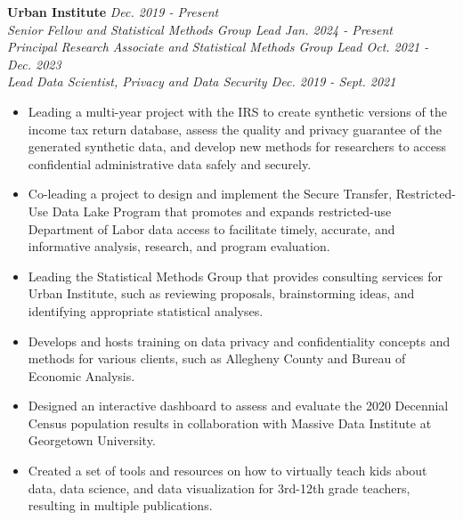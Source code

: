 \documentclass[11pt, letterpaper, roman]{moderncv} %
\begin{document}
\textbf{Urban Institute} \hfill \textit{Dec. 2019 - Present}\\
    \textit{Senior Fellow and Statistical Methods Group Lead \hfill Jan. 2024 - Present}\\
    \textit{Principal Research Associate and Statistical Methods Group Lead \hfill Oct. 2021 - Dec. 2023}\\
    \textit{Lead Data Scientist, Privacy and Data Security \hfill Dec. 2019 - Sept. 2021}
    \begin{itemize}
        \item Leading a multi-year project with the IRS to create synthetic versions of the income tax return database, assess the quality and privacy guarantee of the generated synthetic data, and develop new methods for researchers to access confidential administrative data safely and securely.
        \item Co-leading a project to design and implement the Secure Transfer, Restricted-Use Data Lake Program that promotes and expands restricted-use Department of Labor data access to facilitate timely, accurate, and informative analysis, research, and program evaluation.
        \item Leading the Statistical Methods Group that provides consulting services for Urban Institute, such as reviewing proposals, brainstorming ideas, and identifying appropriate statistical analyses.
        \item Develops and hosts training on data privacy and confidentiality concepts and methods for various clients, such as Allegheny County and Bureau of Economic Analysis.
        \item Designed an interactive dashboard to assess and evaluate the 2020 Decennial Census population results in collaboration with Massive Data Institute at Georgetown University.
        \item Created a set of tools and resources on how to virtually teach kids about data, data science, and data visualization for 3rd-12th grade teachers, resulting in multiple publications.
    \end{itemize}
\end{document}
